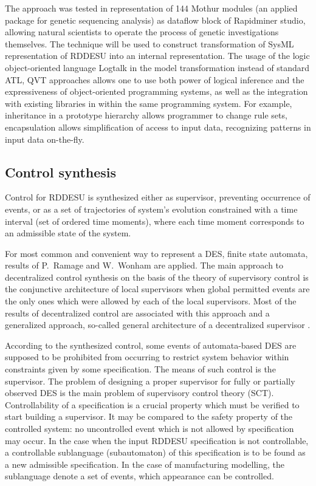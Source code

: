 \documentclass[conference,a4paper]{IEEEtran}
\begin{document}
The approach was tested in representation of 144 Mothur modules (an applied package for genetic sequencing analysis) as dataflow block of Rapidminer studio, allowing natural scientists to operate the process of genetic investigations themselves. The technique will be used to construct transformation of SysML representation of RDDESU into an internal representation. The usage of the logic object-oriented language Logtalk in the model transformation instead of standard ATL, QVT approaches allows one to use both power of logical inference and the expressiveness of object-oriented programming systems, as well as the integration with existing libraries in within the same programming system. For example, inheritance in a prototype hierarchy allows programmer to change rule sets, encapsulation allows simplification of access to input data, recognizing patterns in input data on-the-fly.

\subsection{Control synthesis}
\label{sec:sub-control-syn}

Control for RDDESU is synthesized either as supervisor, preventing occurrence of events, or as a set of trajectories of system’s evolution constrained with a time interval (set of ordered time moments), where each time moment corresponds to an admissible state of the system.

For most common and convenient way to represent a DES, finite state automata, results of P.~Ramage and W.~Wonham \cite{tsyoo} are applied. The main approach to decentralized control synthesis on the basis of the theory of supervisory control is the conjunctive architecture of local supervisors when global permitted events are the only ones which were allowed by each of the local supervisors. Most of the results of decentralized control are associated with this approach \cite{tsyoo} and a generalized approach, so-called general architecture of a decentralized supervisor \cite{tsyoo}.

According to the synthesized control, some events of automata-based DES are supposed to be prohibited from occurring to restrict system behavior within constraints given by some specification. The means of such control is the supervisor. The problem of designing a proper supervisor for fully or partially observed DES is the main problem of supervisory control theory (SCT). Controllability of a specification is a crucial property which must be verified to start building a supervisor. It may be compared to the safety property of the controlled system: no uncontrolled event which is not allowed by specification may occur. In the case when the input RDDESU specification is not controllable, a controllable sublanguage (subautomaton) of this specification is to be found as a new admissible specification. In the case of manufacturing modelling, the sublanguage denote a set of events, which appearance can be controlled. %
\end{document}
